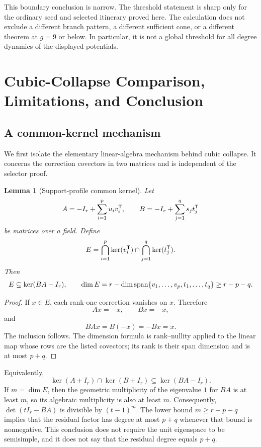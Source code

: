 \documentclass[11pt]{article}
\newtheorem{lemma}[theorem]{Lemma}
\theoremstyle{remark}
\numberwithin{equation}{section}
\begin{document}
This boundary conclusion is narrow.  The threshold statement is
sharp only for the ordinary seed and selected itinerary proved here.  The
calculation does not exclude a different branch pattern, a different
sufficient cone, or a different theorem at \(g=9\) or below.  In
particular, it is not a global threshold for all degree dynamics of the
displayed potentials.

\section{Cubic-Collapse Comparison, Limitations, and Conclusion}\label{sec:comparison}

\subsection{A common-kernel mechanism}

We first isolate the elementary linear-algebra mechanism behind cubic
collapse.  It concerns the correction covectors in two matrices and is
independent of the selector proof.

\begin{lemma}[Support-profile common kernel]\label{lem:common-kernel}
Let
\[
A=-I_r+\sum_{i=1}^{p}u_iv_i^{\mathsf{T}},
\qquad
B=-I_r+\sum_{j=1}^{q}s_jt_j^{\mathsf{T}}
\]
be matrices over a field.  Define
\[
E=
\bigcap_{i=1}^{p}\ker(v_i^{\mathsf{T}})
\cap
\bigcap_{j=1}^{q}\ker(t_j^{\mathsf{T}}).
\]
Then
\[
E\subseteq\ker(BA-I_r),
\qquad
\dim E=r-\dim\operatorname{span}\{v_1,\ldots,v_p,t_1,\ldots,t_q\}
\geq r-p-q.
\]
\end{lemma}

\begin{proof}
If \(x\in E\), each rank-one correction vanishes on \(x\).  Therefore
\[
Ax=-x,\qquad Bx=-x,
\]
and
\[
BAx=B(-x)=-Bx=x.
\]
The inclusion follows.  The dimension formula is rank--nullity applied to
the linear map whose rows are the listed covectors; its rank is their span
dimension and is at most \(p+q\).
\end{proof}

Equivalently,
\[
\ker(A+I_r)\cap\ker(B+I_r)\subseteq\ker(BA-I_r).
\]
If \(m=\dim E\), then the geometric multiplicity of the eigenvalue \(1\)
for \(BA\) is at least \(m\), so its algebraic multiplicity is also at least
\(m\).  Consequently, \(\det(tI_r-BA)\) is divisible by
\((t-1)^m\).  The lower bound \(m\geq r-p-q\) implies that the residual
factor has degree at most \(p+q\) whenever that bound is nonnegative.  This
conclusion does not require the unit eigenspace to be semisimple, and it
does not say that the residual degree equals \(p+q\).
\end{document}
